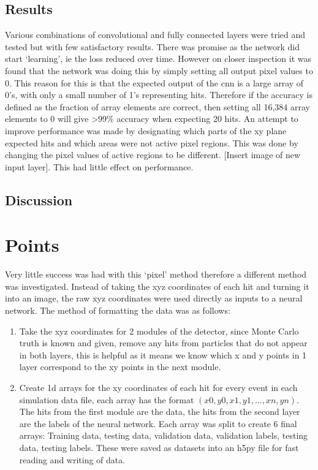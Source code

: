 \subsection{Results}
Various combinations of convolutional and fully connected layers were tried and tested but with few satisfactory results. There was promise as the network did start ‘learning’, ie the loss reduced over time. However on closer inspection it was found that the network was doing this by simply setting all output pixel values to 0. This reason for this is that the expected output of the cnn is a large array of 0's, with only a small number of 1's representing hits. Therefore if the accuracy is defined as the fraction of array elements are correct, then setting all 16,384 array elements to 0 will give >99\% accuracy when expecting 20 hits. An attempt to improve performance was made by designating which parts of the xy plane expected hits and which areas were not active pixel regions. This was done by changing the pixel values of active regions to be different. [Insert image of new input layer]. This had little effect on performance.

\subsection{Discussion}


\section{Points} %
Very little success was had with this ‘pixel’ method therefore a different method was investigated. Instead of taking the xyz coordinates of each hit and turning it into an image, the raw xyz coordinates were used directly as inputs to a neural network. The method of formatting the data was as follows:
\begin{enumerate}
    \item Take the xyz coordinates for 2 modules of the detector, since Monte Carlo truth is known and given, remove any hits from particles that do not appear in both layers, this is helpful as it means we know which x and y points in 1 layer correspond to the xy points in the next module.
    \item  Create 1d arrays for the xy coordinates of each hit for every event in each simulation data file, each array has the format $(x0, y0, x1, y1, …, xn, yn)$. The hits from the first module are the data, the hits from the second layer are the labels of the neural network. Each array was split to create 6 final arrays: Training data, testing data, validation data, validation labels, testing data, testing labels. These were saved as datasets into an h5py file for fast reading and writing of data.
\end{enumerate}

